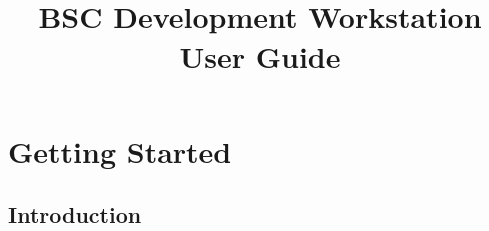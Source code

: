 \documentclass{article}
\begin{document}
\title{
\\
\vspace{0.3in}
BSC Development Workstation \\
User Guide \\
\vspace*{1in}
\mbox{}
}

\maketitle

\newpage

\clearpage
{}
{}

\tableofcontents

\newpage



\section{Getting Started}


\subsection{Introduction}
\end{document}

